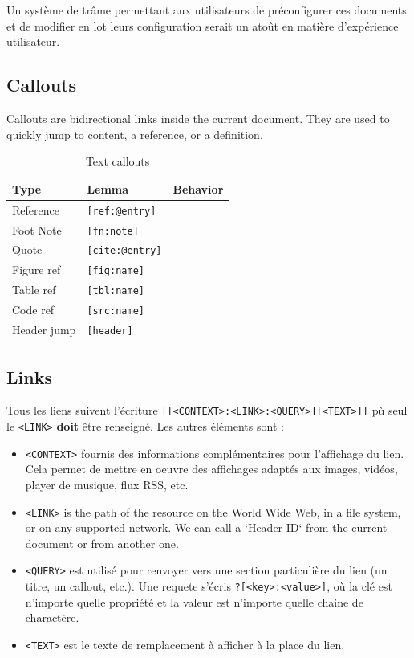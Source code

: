 \documentclass[a4paper,12pt]{article}
\begin{document}
Un système de trâme permettant aux utilisateurs de préconfigurer ces documents et de modifier en lot leurs configuration serait un atoût en matière d'expérience utilisateur.
\subsection{Callouts}
\label{sec:org8a188ff}
Callouts are bidirectional links inside the current document. They are used to quickly jump to content, a reference, or a definition.

\begin{table}[htbp]
\caption{Text callouts}
\centering
\begin{tabular}{lll}
\hline
Type & Lemma & Behavior\\
\hline
Reference & \texttt{[ref:@entry]} & \\
Foot Note & \texttt{[fn:note]} & \\
Quote & \texttt{[cite:@entry]} & \\
Figure ref & \texttt{[fig:name]} & \\
Table ref & \texttt{[tbl:name]} & \\
Code ref & \texttt{[src:name]} & \\
Header jump & \texttt{[header]} & \\
\hline
\end{tabular}
\end{table}
\subsection{Links}
\label{sec:org9136aab}
Tous les liens suivent l'écriture \texttt{[[<CONTEXT>:<LINK>:<QUERY>][<TEXT>]]} pù seul le \texttt{<LINK>} \textbf{doit} être renseigné. Les autres éléments sont : 
\begin{itemize}
\item \texttt{<CONTEXT>} fournis des informations complémentaires pour l'affichage du lien. Cela permet de mettre en oeuvre des affichages adaptés aux images, vidéos, player de musique, flux RSS, etc.
\item \texttt{<LINK>} is the path of the resource on the World Wide Web, in a file system, or on any supported network. We can call a `Header ID` from the current document or from another one.
\item \texttt{<QUERY>} est utilisé pour renvoyer vers une section particulière du lien (un titre, un callout, etc.). Une requete s'écris \texttt{?[<key>:<value>]}, où la clé est n'importe quelle propriété et la valeur est n'importe quelle chaine de charactère.
\item \texttt{<TEXT>} est le texte de remplacement à afficher à la place du lien.
\end{itemize}
\end{document}
